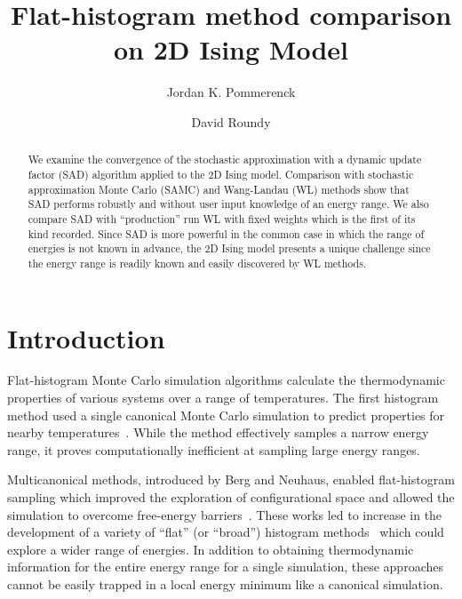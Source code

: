 \documentclass[letterpaper,twocolumn,amsmath,amssymb,pre,aps,10pt]{revtex4-1}
\begin{document}
\title{Flat-histogram method comparison on 2D Ising Model
}

\author{Jordan K. Pommerenck} \author{David Roundy}

\begin{abstract}
We examine the convergence of the stochastic approximation with a dynamic
update factor (SAD) algorithm applied to the 2D Ising model. Comparison with
stochastic approximation Monte Carlo (SAMC) and Wang-Landau (WL) methods show that SAD performs robustly and without user input knowledge of an energy range. We also compare SAD with ``production'' run WL with fixed weights which is the first of its kind recorded. Since SAD is more powerful in the common case in which the range of energies is not known in advance, the 2D Ising model presents a unique challenge since the energy range is readily known and easily discovered by WL methods.
\end{abstract}

\maketitle

\section{Introduction}
Flat-histogram Monte Carlo simulation algorithms calculate the thermodynamic
properties of various systems over a range of temperatures.  The first histogram
method used a single canonical Monte Carlo simulation to predict properties for
nearby temperatures~\cite{ferrenberg1988new}. While the method effectively
samples a narrow energy range, it proves computationally inefficient at sampling large energy ranges.

Multicanonical methods, introduced by Berg and Neuhaus, enabled flat-histogram
sampling which improved the exploration of configurational space and allowed the
simulation to overcome free-energy barriers~\cite{berg1991multicanonical, berg1992multicanonical}.
These works led to increase in the development of a variety of ``flat'' (or ``broad'') histogram
methods~\cite{penna1996broad, penna1998broad, swendsen1999transition,
wang2001determining, wang2001efficient} which could explore a wider range
of energies.  In addition to obtaining thermodynamic information for the entire
energy range for a single simulation, these approaches cannot be easily trapped
in a local energy minimum like a canonical simulation.
\end{document}
